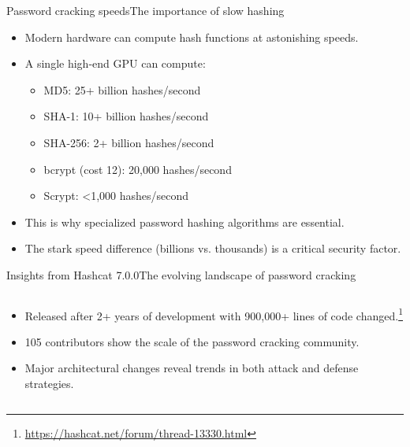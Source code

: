 \documentclass[aspectratio=169, lualatex, handout]{beamer}
\begin{document}
\begin{frame}{Password cracking speeds}{The importance of slow hashing}
	\begin{itemize}
		\item Modern hardware can compute hash functions at astonishing speeds.
		\item A single high-end GPU can compute:
		      \begin{itemize}
			      \item MD5: 25+ billion hashes/second
			      \item SHA-1: 10+ billion hashes/second
			      \item SHA-256: 2+ billion hashes/second
			      \item bcrypt (cost 12): 20,000 hashes/second
			      \item Scrypt: <1,000 hashes/second
		      \end{itemize}
		\item This is why specialized password hashing algorithms are essential.
		\item The stark speed difference (billions vs. thousands) is a critical security factor.
	\end{itemize}
\end{frame}

\begin{frame}{Insights from Hashcat 7.0.0}{The evolving landscape of password cracking}
	\begin{columns}[c]
		\begin{column}{1\textwidth}
			\begin{itemize}
				\item Released after 2+ years of development with 900,000+ lines of code changed.\footnote{\url{https://hashcat.net/forum/thread-13330.html}}
				\item 105 contributors show the scale of the password cracking community.
				\item Major architectural changes reveal trends in both attack and defense strategies.
			\end{itemize}
		\end{column}
	\end{columns}
\end{frame}
\end{document}
